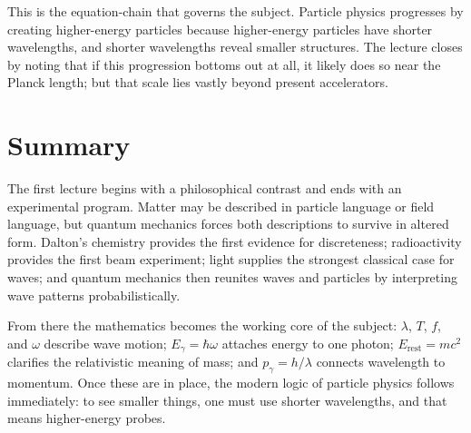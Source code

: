 This is the equation-chain that governs the subject. Particle physics progresses by creating higher-energy particles because higher-energy particles have shorter wavelengths, and shorter wavelengths reveal smaller structures. The lecture closes by noting that if this progression bottoms out at all, it likely does so near the Planck length; but that scale lies vastly beyond present accelerators.

\section{Summary}

The first lecture begins with a philosophical contrast and ends with an experimental program. Matter may be described in particle language or field language, but quantum mechanics forces both descriptions to survive in altered form. Dalton's chemistry provides the first evidence for discreteness; radioactivity provides the first beam experiment; light supplies the strongest classical case for waves; and quantum mechanics then reunites waves and particles by interpreting wave patterns probabilistically.

From there the mathematics becomes the working core of the subject: \(\lambda\), \(T\), \(f\), and \(\omega\) describe wave motion; \(E_\gamma=\hbar\omega\) attaches energy to one photon; \(E_{\mathrm{rest}}=mc^2\) clarifies the relativistic meaning of mass; and \(p_\gamma=h/\lambda\) connects wavelength to momentum. Once these are in place, the modern logic of particle physics follows immediately: to see smaller things, one must use shorter wavelengths, and that means higher-energy probes.